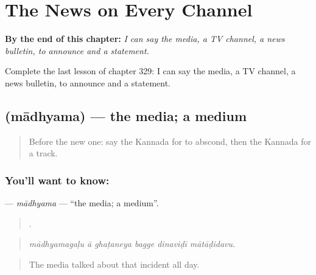 
\chapter{The News on Every Channel}
\label{ch:ka-the-news-on-every-channel}

\begin{chapteropening}
\textbf{By the end of this chapter:} \emph{I can say the media, a TV channel, a news bulletin, to announce and a statement.}

Complete the last lesson of chapter 329: I can say the media, a TV channel, a news bulletin, to announce and a statement.
\end{chapteropening}

\section[\texorpdfstring{\kn{ಮಾಧ್ಯಮ} (mādhyama)}{ಮಾಧ್ಯಮ (mādhyama)}]{ (mādhyama) — the media; a medium}

\label{lesson:KA-C329-madhyama}



\begin{quote}
Before the new one: say the Kannada for to abscond, then the Kannada for a track.
\end{quote}

\subsection*{You'll want to know: }
\textbf{} — \emph{mādhyama} — \textquotedblleft{}the media; a medium\textquotedblright{}.

\begin{quote}
     .
\end{quote}

\begin{quote}
\emph{mādhyamagaḷu ā ghaṭaneya bagge dinaviḍī mātāḍidavu.}
\end{quote}

\begin{quote}
The media talked about that incident all day.
\end{quote}


